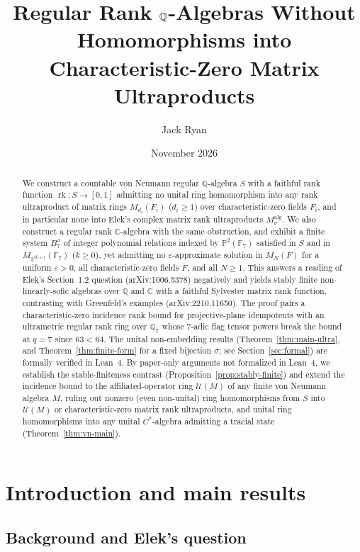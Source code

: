 \documentclass[11pt]{article}
\title{Regular Rank \texorpdfstring{$\Q$}{Q}-Algebras Without Homomorphisms into Characteristic-Zero Matrix Ultraproducts}
\author{Jack Ryan}
\date{November 2026}
\theoremstyle{definition}
\theoremstyle{remark}
\numberwithin{equation}{section}
\DeclareMathOperator{\rk}{rk}
\newcommand{\Q}{\mathbb{Q}}
\newcommand{\C}{\mathbb{C}}
\newcommand{\F}{\mathbb{F}}
\newcommand{\U}{\mathcal{U}}
\newcommand{\1}{\mathbf{1}}
\begin{document}
\maketitle

\begin{abstract}
We construct a countable von Neumann regular $\Q$-algebra $S$ with a faithful rank function $\rk\colon S \to [0,1]$ admitting no unital ring homomorphism into any rank ultraproduct of matrix rings $M_{d_i}(F_i)$ ($d_i \ge 1$) over characteristic-zero fields $F_i$, and in particular none into Elek's complex matrix rank ultraproducts $M^{\mathrm{alg}}_\nu$. We also construct a regular rank $\C$-algebra with the same obstruction, and exhibit a finite system $B_7^\sigma$ of integer polynomial relations indexed by $\mathbb{P}^2(\F_7)$ satisfied in $S$ and in $M_{3^{3k+1}}(\F_7)$ ($k \ge 0$), yet admitting no $\varepsilon$-approximate solution in $M_N(F)$ for a uniform $\varepsilon > 0$, all characteristic-zero fields $F$, and all $N \ge 1$. This answers a reading of Elek's Section~1.2 question (arXiv:1006.5378) negatively and yields stably finite non-linearly-sofic algebras over $\Q$ and $\C$ with a faithful Sylvester matrix rank function, contrasting with Greenfeld's examples (arXiv:2210.11650). The proof pairs a characteristic-zero incidence rank bound for projective-plane idempotents with an ultrametric regular rank ring over $\Q_7$ whose $7$-adic flag tensor powers break the bound at $q=7$ since $63 < 64$. The unital non-embedding results (Theorem~\ref{thm:main-ultra}, and Theorem~\ref{thm:finite-form} for a fixed bijection $\sigma$; see Section~\ref{sec:formal}) are formally verified in Lean~4. By paper-only arguments not formalized in Lean~4, we establish the stable-finiteness contrast (Proposition~\ref{prop:stably-finite}) and extend the incidence bound to the affiliated-operator ring $\U(M)$ of any finite von Neumann algebra $M$, ruling out nonzero (even non-unital) ring homomorphisms from $S$ into $\U(M)$ or characteristic-zero matrix rank ultraproducts, and unital ring homomorphisms into any unital $C^*$-algebra admitting a tracial state (Theorem~\ref{thm:vn-main}).
\end{abstract}

\section{Introduction and main results}
\label{sec:intro}

\subsection{Background and Elek's question}
\end{document}
